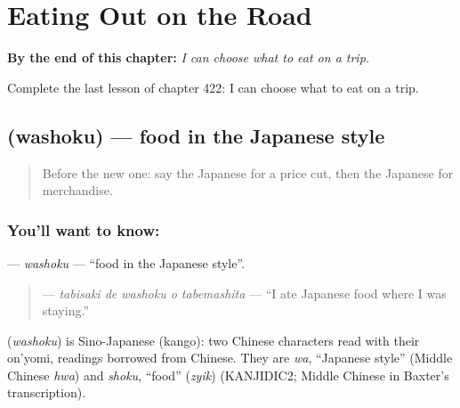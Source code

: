 
\chapter{Eating Out on the Road}
\label{ch:ja-eating-out-on-the-road}

\begin{chapteropening}
\textbf{By the end of this chapter:} \emph{I can choose what to eat on a trip.}

Complete the last lesson of chapter 422: I can choose what to eat on a trip.
\end{chapteropening}

\section[\texorpdfstring{\ja{わしょく} (washoku)}{わしょく (washoku)}]{ (washoku) — food in the Japanese style}

\label{lesson:JA-C422-washoku}



\begin{quote}
Before the new one: say the Japanese for a price cut, then the Japanese for merchandise.
\end{quote}

\subsection*{You'll want to know: }
\textbf{} — \emph{washoku} — \textquotedblleft{}food in the Japanese style\textquotedblright{}.

\begin{quote}
\textbf{  } — \emph{tabisaki de washoku o tabemashita} — \textquotedblleft{}I ate Japanese food where I was staying.\textquotedblright{}
\end{quote}

\begin{cousinweb}
\textbf{} (\emph{washoku}) is Sino-Japanese (kango): two Chinese characters read with their on'yomi, readings borrowed from Chinese. They are \emph{wa}, \textquotedblleft{}Japanese style\textquotedblright{} (Middle Chinese \emph{hwa}) and \emph{shoku}, \textquotedblleft{}food\textquotedblright{} (\emph{zyik}) (KANJIDIC2; Middle Chinese in Baxter's transcription).
\end{cousinweb}


